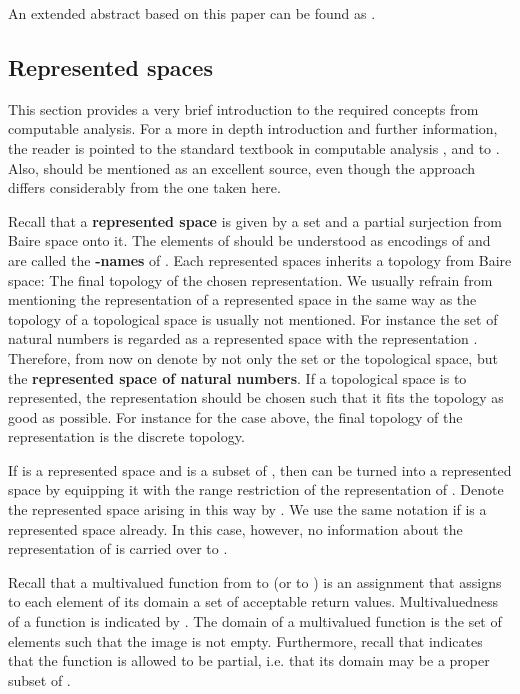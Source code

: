 \documentclass{eptcs-modified}
\newcommand{\demph}{\textbf}
\begin{document}
		An extended abstract based on this paper can be found as \cite{pauly-steinberg-csr}.

		\subsection{Represented spaces}
			This section provides a very brief introduction to the required concepts from computable analysis.
			For a more in depth introduction and further information, the reader is pointed to the standard textbook in computable analysis \cite{MR1795407}, and to \cite{pauly-synthetic}.
			Also, \cite{MR1005942} should be mentioned as an excellent source, even though the approach differs considerably from the one taken here.
		
			Recall that a \demph{represented space}  is given by a set  and a partial surjection  from Baire space onto it.
			The elements of  should be understood as encodings of  and are called the \demph{-names} of .
			Each represented spaces inherits a topology from Baire space:
			The final topology of the chosen representation.
			We usually refrain from mentioning the representation of a represented space in the same way as the topology of a topological space is usually not mentioned.
			For instance the set of natural numbers is regarded as a represented space with the representation .
			Therefore, from now on denote by  not only the set or the topological space, but the \demph{represented space of natural numbers}.
			If a topological space is to represented, the representation should be chosen such that it fits the topology as good as possible.
			For instance for the case  above, the final topology of the representation is the discrete topology.

			If  is a represented space and  is a subset of , then  can be turned into a represented space by equipping it with the range restriction of the representation of .
			Denote the represented space arising in this way by .
			We use the same notation  if  is a represented space already.
			In this case, however, no information about the representation of  is carried over to .
			
			Recall that a multivalued function  from  to  (or  to ) is an assignment that assigns to each element  of its domain a set  of acceptable return values.
			Multivaluedness of a function is indicated by .
			The domain of a multivalued function is the set of elements such that the image is not empty.
			Furthermore, recall that  indicates that the function  is allowed to be partial, i.e. that its domain may be a proper subset of .
\end{document}
